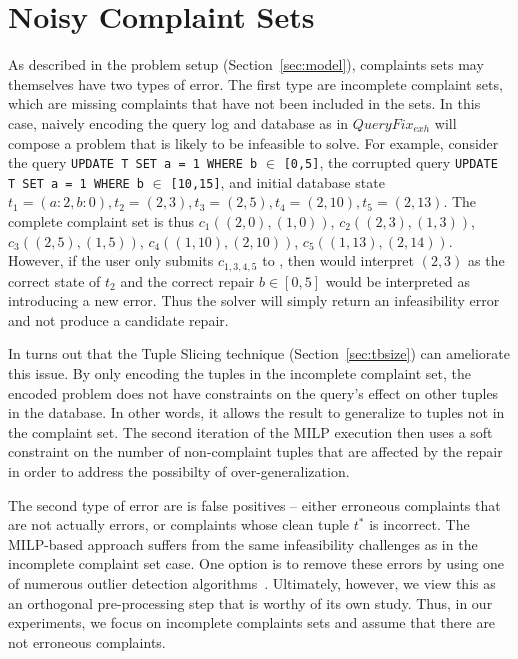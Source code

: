 \section{Noisy Complaint Sets}
\label{sec:noise}

As described in the problem setup (Section~\ref{sec:model}),
complaints sets may themselves have two types of error.
The first type are incomplete complaint sets, which are missing complaints
that have not been included in the sets.
In this case, naively encoding the query log and database as in $QueryFix_{exh}$
will compose a problem that is likely to be infeasible to solve.  
For example, consider the query \texttt{\small UPDATE T SET a = 1 WHERE b} $\in$ \texttt{\small [0,5]},
the corrupted query \texttt{\small UPDATE T SET a = 1 WHERE b} $\in$ \texttt{\small [10,15]},
and initial database state $t_1=(a:2, b:0), t_2=(2, 3), t_3=(2, 5), t_4=(2, 10), t_5=(2, 13)$.
The complete complaint set is thus $c_1((2,0), (1,0))$, $c_2((2,3), (1,3))$, $c_3((2,5), (1,5))$, $c_4((1,10), (2,10))$, $c_5((1,13), (2,14))$.
However, if the user only submits $c_{1,3,4,5}$ to \sys, then \sys would interpret $(2,3)$
as the correct state of $t_2$ and the correct repair $b \in [0, 5]$ would 
be interpreted as introducing a new error.   Thus the solver will simply return
an infeasibility error and not produce a candidate repair.

In turns out that the Tuple Slicing technique (Section~\ref{sec:tbsize})
can ameliorate this issue.  By only encoding the tuples in the incomplete complaint set,
the encoded problem does not have constraints on the query's effect on other tuples in the database.
In other words, it allows the result to generalize to tuples not in the complaint set.
The second iteration of the MILP execution then uses a soft constraint on the number of
non-complaint tuples that are affected by the repair in order to address the possibilty of over-generalization.

The second type of error are is false positives -- either erroneous complaints that are 
not actually errors, or complaints whose clean tuple $t^*$ is incorrect.
The MILP-based approach suffers from the same infeasibility challenges as in the incomplete complaint set case.
One option is to remove these errors by using one of numerous outlier detection algorithms~\cite{}.
Ultimately, however, we view this as an orthogonal pre-processing step that is worthy of its own study.
Thus, in our experiments, we focus on incomplete complaints sets and assume that
there are not erroneous complaints.


